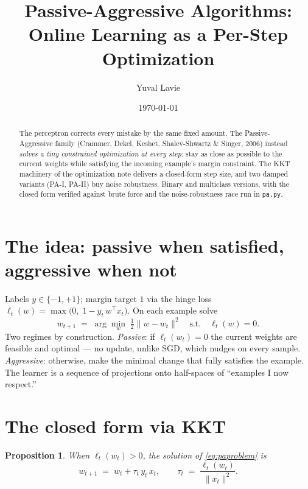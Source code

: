 \documentclass[11pt]{article}
\title{Passive-Aggressive Algorithms:\\
Online Learning as a Per-Step Optimization}
\author{Yuval Lavie}
\date{\today}
\newtheorem{proposition}{Proposition}
\begin{document}
\maketitle

\begin{abstract}
The perceptron corrects every mistake by the same fixed amount. The
Passive-Aggressive family (Crammer, Dekel, Keshet, Shalev-Shwartz \&
Singer, 2006) instead \emph{solves a tiny constrained optimization at
every step}: stay as close as possible to the current weights while
satisfying the incoming example's margin constraint. The KKT machinery of
the optimization note delivers a closed-form step size, and two damped
variants (PA-I, PA-II) buy noise robustness. Binary and multiclass
versions, with the closed form verified against brute force and the
noise-robustness race run in \texttt{pa.py}.
\end{abstract}

\section{The idea: passive when satisfied, aggressive when not}

Labels $y \in \{-1,+1\}$; margin target $1$ via the hinge loss
$\ell_t(w) = \max\bigl(0,\; 1 - y_t\, w^\top x_t\bigr)$. On each example
solve
\begin{equation}
  w_{t+1} \;=\; \arg\min_{w}\; \tfrac12\lVert w - w_t\rVert^2
  \quad\text{s.t.}\quad \ell_t(w) = 0 .
  \label{eq:paproblem}
\end{equation}
Two regimes by construction. \emph{Passive}: if $\ell_t(w_t) = 0$ the
current weights are feasible and optimal --- no update, unlike SGD, which
nudges on every sample. \emph{Aggressive}: otherwise, make the minimal
change that fully satisfies the example. The learner is a sequence of
projections onto half-spaces of ``examples I now respect.''

\section{The closed form via KKT}

\begin{proposition}
When $\ell_t(w_t) > 0$, the solution of \eqref{eq:paproblem} is
\begin{equation}
  \boxed{\;w_{t+1} \;=\; w_t + \tau_t\, y_t\, x_t,
  \qquad
  \tau_t \;=\; \frac{\ell_t(w_t)}{\lVert x_t\rVert^2}.\;}
  \label{eq:pastep}
\end{equation}
\end{proposition}
\end{document}
